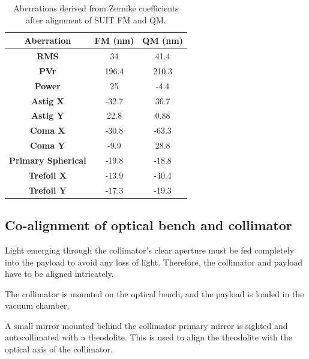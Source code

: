 \documentclass[12pt]{spieman}  %
\begin{document}
\begin{table}[ht]
\caption{Aberrations derived from Zernike coefficients after alignment of SUIT FM and QM.}
\label{table: zernikes}
    \begin{center}
			\begin{tabular}{|c|c|c|}
				\hline
				\rule[-1ex]{0pt}{2.5ex} \textbf{Aberration} & \textbf{FM (nm)} & \textbf{QM (nm)}\\
				\hline
				\hline
				\rule[-1ex]{0pt}{2.5ex} \textbf{RMS} & 34 & 41.4 \\
				\hline
				\rule[-1ex]{0pt}{2.5ex} \textbf{PVr} & 196.4 & 210.3 \\
				\hline
				\rule[-1ex]{0pt}{2.5ex} \textbf{Power} & 25 & -4.4 \\
				\hline
				\rule[-1ex]{0pt}{2.5ex} \textbf{Astig X} & -32.7 & 36.7 \\
				\hline
				\rule[-1ex]{0pt}{2.5ex} \textbf{Astig Y} & 22.8 & 0.88 \\
				\hline
				\rule[-1ex]{0pt}{2.5ex} \textbf{Coma X} & -30.8 & -63.3 \\
				\hline
				\rule[-1ex]{0pt}{2.5ex} \textbf{Coma Y} & -9.9 & 28.8 \\
				\hline
				\rule[-1ex]{0pt}{2.5ex} \textbf{Primary Spherical} & -19.8 & -18.8 \\
				\hline
				\rule[-1ex]{0pt}{2.5ex} \textbf{Trefoil X} & -13.9 & -40.4 \\
				\hline
				\rule[-1ex]{0pt}{2.5ex} \textbf{Trefoil Y }& -17.3 & -19.3 \\
				\hline
			\end{tabular}
		\end{center}
	\end{table} 
	
	\subsection{Co-alignment of optical bench and collimator}
	Light emerging through the collimator's clear aperture must be fed completely into the payload to avoid any loss of light. Therefore, the collimator and payload have to be aligned intricately.
	
	The collimator is mounted on the optical bench, and the payload is loaded in the vacuum chamber. 
	
	A small mirror mounted behind the collimator primary mirror is sighted and autocollimated with a theodolite. This is used to align the theodolite with the optical axis of the collimator.
	
\end{document}
